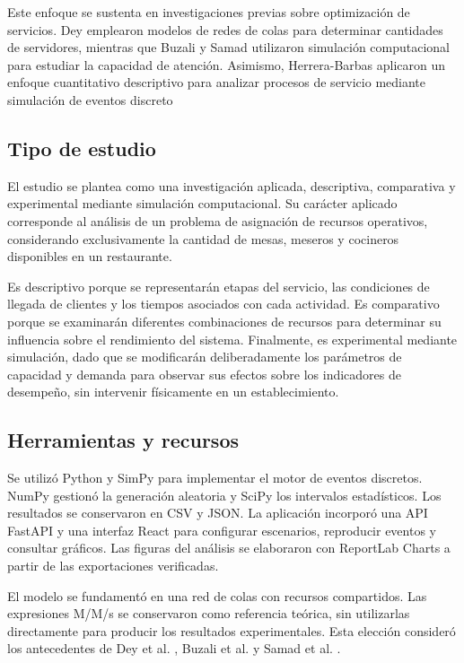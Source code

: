 \documentclass[10pt,a4paper,twocolumn]{article}
\begin{document}
Este enfoque se sustenta en investigaciones previas sobre optimización de servicios. Dey \cite{ref2} emplearon modelos de redes de colas para determinar cantidades de servidores, mientras que Buzali \cite{ref8} y Samad \cite{ref9} utilizaron simulación computacional para estudiar la capacidad de atención. Asimismo, Herrera-Barbas \cite{ref10} aplicaron un enfoque cuantitativo descriptivo para analizar procesos de servicio mediante simulación de eventos discreto

\subsection{Tipo de estudio}

El estudio se plantea como una investigación aplicada, descriptiva, comparativa y experimental mediante simulación computacional. Su carácter aplicado corresponde al análisis de un problema de asignación de recursos operativos, considerando exclusivamente la cantidad de mesas, meseros y cocineros disponibles en un restaurante.

Es descriptivo porque se representarán etapas del servicio, las condiciones de llegada de clientes y los tiempos asociados con cada actividad. Es comparativo porque se examinarán diferentes combinaciones de recursos para determinar su influencia sobre el rendimiento del sistema. Finalmente, es experimental mediante simulación, dado que se modificarán deliberadamente los parámetros de capacidad y demanda para observar sus efectos sobre los indicadores de desempeño, sin intervenir físicamente en un establecimiento.

\subsection{Herramientas y recursos}

Se utilizó Python y SimPy para implementar el motor de eventos discretos. NumPy gestionó la generación aleatoria y SciPy los intervalos estadísticos. Los resultados se conservaron en CSV y JSON. La aplicación incorporó una API FastAPI y una interfaz React para configurar escenarios, reproducir eventos y consultar gráficos. Las figuras del análisis se elaboraron con ReportLab Charts a partir de las exportaciones verificadas.

El modelo se fundamentó en una red de colas con recursos compartidos. Las expresiones M/M/s se conservaron como referencia teórica, sin utilizarlas directamente para producir los resultados experimentales. Esta elección consideró los antecedentes de Dey et al. \cite{ref2}, Buzali et al. \cite{ref8} y Samad et al. \cite{ref9}.
\end{document}
